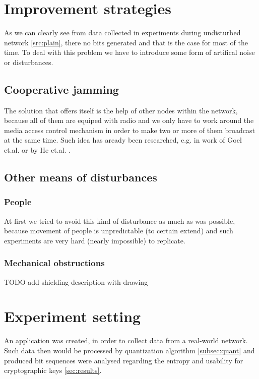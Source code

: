 \documentclass[
  print, %
  table,   %
  nolof,     %
  nolot,     %
           oneside
]{fithesis3}
\begin{document}
  \section{Improvement strategies}
  As we can clearly see from data collected in experiments during undisturbed network \ref{src:plain}, there no bits generated and that is the case for most of the time. To deal with this problem we have to introduce some form of artifical noise or disturbances.
  \subsection{Cooperative jamming}\label{subsec:jammer}
  The solution that offers itself is the help of other nodes within the network, because all of them are equiped with radio and we only have to work around the media access control mechanism in order to make two or more of them broadcast at the same time. Such idea has aready been researched, e.g. in work of Goel et.al. \cite{Goel2008Noise} or by He et.al. \cite{He2010Jamming}.



  \subsection{Other means of disturbances}\label{subsec:people}
  \subsubsection{People}\label{subsubsec:people}
  At first we tried to avoid this kind of disturbance as much as was possible, because movement of people is unpredictable (to certain extend) and such experiments are very hard (nearly impossible) to replicate.
  \subsubsection{Mechanical obstructions}\label{subsec:shield}
  TODO add shielding description with drawing

  \section{Experiment setting}
  An application was created, in order to collect data from a real-world network. Such data then would be processed by quantization algorithm \ref{subsec:quant} and produced bit sequences were analysed regarding the entropy and usability for cryptographic keys \ref{sec:results}.
\end{document}
